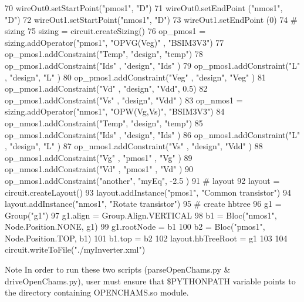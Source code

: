 \begin{DoxyCodeInclude}
70 wireOut0.setStartPoint(\textcolor{stringliteral}{"pmos1"}, \textcolor{stringliteral}{"D"})
71 wireOut0.setEndPoint  (\textcolor{stringliteral}{"nmos1"}, \textcolor{stringliteral}{"D"})
72 wireOut1.setStartPoint(\textcolor{stringliteral}{"nmos1"}, \textcolor{stringliteral}{"D"})
73 wireOut1.setEndPoint  (0)
74 \textcolor{comment}{# sizing}
75 sizing = circuit.createSizing()
76 op\_pmos1 = sizing.addOperator(\textcolor{stringliteral}{"pmos1"}, \textcolor{stringliteral}{"OPVG(Veg)"} , \textcolor{stringliteral}{"BSIM3V3"})
77 op\_pmos1.addConstraint(\textcolor{stringliteral}{"Temp"}, \textcolor{stringliteral}{"design"}, \textcolor{stringliteral}{"temp"})
78 op\_pmos1.addConstraint(\textcolor{stringliteral}{"Ids"} , \textcolor{stringliteral}{"design"}, \textcolor{stringliteral}{"Ids"} )
79 op\_pmos1.addConstraint(\textcolor{stringliteral}{"L"}   , \textcolor{stringliteral}{"design"}, \textcolor{stringliteral}{"L"}   )
80 op\_pmos1.addConstraint(\textcolor{stringliteral}{"Veg"} , \textcolor{stringliteral}{"design"}, \textcolor{stringliteral}{"Veg"} )
81 op\_pmos1.addConstraint(\textcolor{stringliteral}{"Vd"}  , \textcolor{stringliteral}{"design"}, \textcolor{stringliteral}{"Vdd"}, 0.5)
82 op\_pmos1.addConstraint(\textcolor{stringliteral}{"Vs"}  , \textcolor{stringliteral}{"design"}, \textcolor{stringliteral}{"Vdd"} )
83 op\_nmos1 = sizing.addOperator(\textcolor{stringliteral}{"nmos1"}, \textcolor{stringliteral}{"OPW(Vg,Vs)"}, \textcolor{stringliteral}{"BSIM3V3"})
84 op\_nmos1.addConstraint(\textcolor{stringliteral}{"Temp"}, \textcolor{stringliteral}{"design"}, \textcolor{stringliteral}{"temp"})
85 op\_nmos1.addConstraint(\textcolor{stringliteral}{"Ids"} , \textcolor{stringliteral}{"design"}, \textcolor{stringliteral}{"Ids"} )
86 op\_nmos1.addConstraint(\textcolor{stringliteral}{"L"}   , \textcolor{stringliteral}{"design"}, \textcolor{stringliteral}{"L"}   )
87 op\_nmos1.addConstraint(\textcolor{stringliteral}{"Vs"}  , \textcolor{stringliteral}{"design"}, \textcolor{stringliteral}{"Vdd"} )
88 op\_nmos1.addConstraint(\textcolor{stringliteral}{"Vg"}  , \textcolor{stringliteral}{"pmos1"} , \textcolor{stringliteral}{"Vg"}  )
89 op\_nmos1.addConstraint(\textcolor{stringliteral}{"Vd"}  , \textcolor{stringliteral}{"pmos1"} , \textcolor{stringliteral}{"Vd"}  )
90 op\_nmos1.addConstraint(\textcolor{stringliteral}{"another"}, \textcolor{stringliteral}{"myEq"}, -2.5 )
91 \textcolor{comment}{# layout}
92 layout = circuit.createLayout()
93 layout.addInstance(\textcolor{stringliteral}{"pmos1"}, \textcolor{stringliteral}{"Common transistor"})
94 layout.addInstance(\textcolor{stringliteral}{"nmos1"}, \textcolor{stringliteral}{"Rotate transistor"})
95 \textcolor{comment}{# create hbtree}
96 g1 = Group(\textcolor{stringliteral}{"g1"})
97 g1.align = Group.Align.VERTICAL
98 b1 = Bloc(\textcolor{stringliteral}{"nmos1"}, Node.Position.NONE, g1)
99 g1.rootNode = b1 
100 b2 = Bloc(\textcolor{stringliteral}{"pmos1"}, Node.Position.TOP, b1)
101 b1.top = b2
102 layout.hbTreeRoot = g1
103 
104 circuit.writeToFile(\textcolor{stringliteral}{"./myInverter.xml"})
\end{DoxyCodeInclude}


\begin{DoxyNote}{Note}
In order to run these two scripts ({\ttfamily parse\-Open\-Chams.\-py} \& drive\-Open\-Chams.\-py), user must ensure that \$\-P\-Y\-T\-H\-O\-N\-P\-A\-T\-H variable points to the directory containing O\-P\-E\-N\-C\-H\-A\-M\-S.\-so module. 
\end{DoxyNote}
